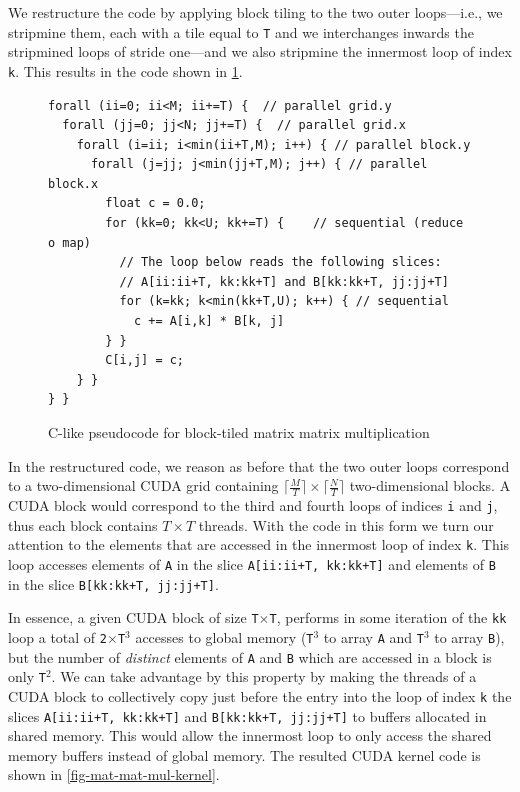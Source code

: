 \documentclass[acmsmall,review]{acmart}\settopmatter{printfolios=true,printccs=false,printacmref=false}
\begin{document}
We restructure the code by applying block tiling to the two outer 
loops---i.e., we stripmine them, each with a tile equal to {\tt T} 
and we interchanges inwards the stripmined loops of stride one---and 
we also stripmine the innermost loop of index {\tt k}.
This results in the code shown in \cref{fig-mat-mat-mul-c-code}.

\begin{figure}
\begin{lstlisting}[mathescape=true]
forall (ii=0; ii<M; ii+=T) {  // parallel grid.y
  forall (jj=0; jj<N; jj+=T) {  // parallel grid.x
    forall (i=ii; i<min(ii+T,M); i++) { // parallel block.y
      forall (j=jj; j<min(jj+T,M); j++) { // parallel block.x
        float c = 0.0;
        for (kk=0; kk<U; kk+=T) {    // sequential (reduce o map)
          // The loop below reads the following slices:
          // A[ii:ii+T, kk:kk+T] and B[kk:kk+T, jj:jj+T]
          for (k=kk; k<min(kk+T,U); k++) { // sequential
            c += A[i,k] * B[k, j]
        } }
        C[i,j] = c;
    } }
} } 
\end{lstlisting}\vspace{-4ex}
\caption{C-like pseudocode for block-tiled matrix matrix multiplication}
\label{fig-mat-mat-mul-c-code}
\end{figure}

In the restructured code, we reason as before that the two outer loops
correspond to a two-dimensional CUDA grid containing 
$\lceil \frac{M}{T} \rceil \times \lceil \frac{N}{T} \rceil$ two-dimensional
blocks. A CUDA block would correspond to the third and fourth loops of
indices {\tt i} and {\tt j}, thus each block contains $T \times T$ threads.
With the code in this form we turn our attention to the elements that
are accessed in the innermost loop of index {\tt k}. This loop accesses
elements of {\tt A} in the slice {\tt A[ii:ii+T, kk:kk+T]} and elements
of {\tt B} in the slice {\tt B[kk:kk+T, jj:jj+T]}. 

In essence, a given CUDA block of size {\tt T$\times$T}, performs
in some iteration of the {\tt kk} loop a total of {\tt 2$\times$T$^3$} 
accesses to global memory ({\tt T$^3$} to array {\tt A} and {\tt T$^3$} 
to array {\tt B}), but the number of {\em distinct} elements of 
{\tt A} and {\tt B} which are accessed in a block is only {\tt T$^2$}.
We can take advantage by this property by making the threads of a CUDA
block to collectively copy just before the entry into the loop of index
{\tt k} the slices {\tt A[ii:ii+T, kk:kk+T]} and {\tt B[kk:kk+T, jj:jj+T]}
to buffers allocated in shared memory. This would allow the innermost
loop to only access the shared memory buffers instead of global memory.
The resulted CUDA kernel code is shown in \cref{fig-mat-mat-mul-kernel}.
\end{document}
